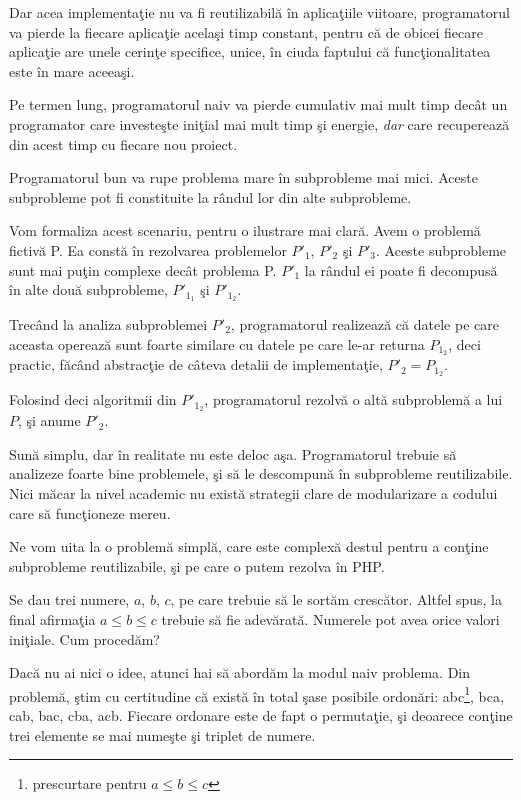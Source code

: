 Dar acea implementaţie nu va fi reutilizabilă în aplicaţiile
viitoare, programatorul va pierde la fiecare aplicaţie
acelaşi timp constant, pentru că de obicei fiecare aplicaţie
are unele cerinţe specifice, unice, în ciuda faptului că
funcţionalitatea este în mare aceeaşi.

Pe termen lung, programatorul naiv va pierde cumulativ mai mult timp
decât un programator care investeşte iniţial mai mult timp şi
energie, \textit{dar} care recuperează din acest timp
cu fiecare nou proiect.

Programatorul bun va rupe problema mare în subprobleme mai mici.
Aceste subprobleme pot fi constituite la rândul lor din alte subprobleme.

Vom formaliza acest scenariu, pentru o ilustrare mai clară. Avem o problemă fictivă P.
Ea constă în rezolvarea problemelor $P'_1$, $P'_2$ şi $P'_3$. Aceste subprobleme
sunt mai puţin complexe decât problema P. $P'_1$ la rândul ei poate fi decompusă în alte
două subprobleme, $P'_{1_1}$ şi $P'_{1_2}$.

Trecând la analiza subproblemei $P'_2$, programatorul realizează că datele pe care
aceasta operează sunt foarte similare cu datele pe care le-ar returna $P_{1_2}$, deci
practic, făcând abstracţie de câteva detalii de implementaţie, $P'_2 = P_{1_2}$.

Folosind deci algoritmii din $P'_{1_2}$, programatorul rezolvă o altă subproblemă a lui $P$,
şi anume $P'_2$.


Sună simplu, dar în realitate nu este deloc aşa. Programatorul trebuie să analizeze foarte
bine problemele, şi să le descompună în subprobleme reutilizabile. Nici măcar la
nivel academic nu există strategii clare de modularizare a codului care să funcţioneze mereu.

Ne vom uita la o problemă simplă, care este complexă destul pentru a conţine subprobleme reutilizabile,
şi pe care o putem rezolva în PHP.

Se dau trei numere, $a$, $b$, $c$, pe care trebuie să le sortăm crescător. Altfel spus, la final
afirmaţia $a \leq b \leq c$ trebuie să fie adevărată. Numerele pot avea orice valori iniţiale.
Cum procedăm?

Dacă nu ai nici o idee, atunci hai să abordăm la modul naiv problema. Din problemă, ştim
cu certitudine că
există în total şase posibile ordonări: abc\footnote{prescurtare pentru  $a \leq b \leq c$},
bca, cab, bac, cba, acb. Fiecare ordonare este de fapt o permutaţie, şi deoarece conţine trei
elemente se mai numeşte şi triplet de numere.

